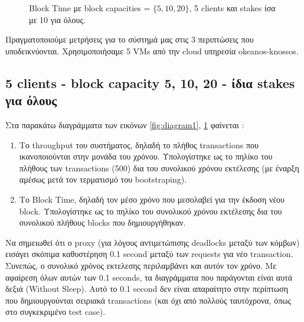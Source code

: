 \documentclass[12pt, a4paper]{article}
\begin{document}
	
	\begin{figure}[b!]
		\centering
		
		\caption{Block Time με block capacities = $\{5, 10, 20\}$, 5 clients και stakes ίσα με 10 για όλους.}
		\label{fig:diagram2}
	\end{figure}
	Πραγματοποιούμε μετρήσεις για το σύστημά μας στις 3 περιπτώσεις που υποδεικνύονται. Χρησιμοποιήσαμε 5 VMs από την cloud υπηρεσία okeanos-knossos.
	\subsection{5 clients - block capacity 5, 10, 20 - ίδια stakes για όλους}
	Στα παρακάτω διαγράμματα των εικόνων \ref{fig:diagram1}, \ref{fig:diagram2} φαίνεται :
	\begin{enumerate}
		\item Το throughput του συστήματος, δηλαδή το πλήθος transactions που ικανοποιούνται στην μονάδα του χρόνου. Υπολογίστηκε ως το πηλίκο του πλήθους των transactions (500) δια του συνολικού χρόνου εκτέλεσης (με έναρξη αμέσως μετά τον τερματισμό του bootstraping).
		\item Το Block Time, δηλαδή τον μέσο χρόνο που μεσολαβεί για την έκδοση νέου block. Υπολογίστηκε ως το πηλίκο του συνολικού χρόνου εκτέλεσης δια του συνολικού πλήθους blocks που δημιουργήθηκαν. 
	\end{enumerate}
Να σημειωθεί ότι ο proxy (για λόγους αντιμετώπισης deadlocks μεταξύ των κόμβων) εισάγει σκόπιμα καθυστέρηση 0.1 second μεταξύ των requests για νέο transaction. Συνεπώς, ο συνολικό χρόνος εκτελεσης περιλαμβάνει και αυτόν τον χρόνο. Με αφαίρεση όλων αυτών των 0.1 seconds, τα διαγράμματα που παράγονται είναι αυτά δεξιά (Without Sleep). Αυτό το 0.1 second δεν είναι απαραίτητο στην περίπτωση που δημιουργούνται σειριακά transactions (και όχι από πολλούς ταυτόχρονα, όπως στο συγκεκριμένο test case). 
\end{document}

